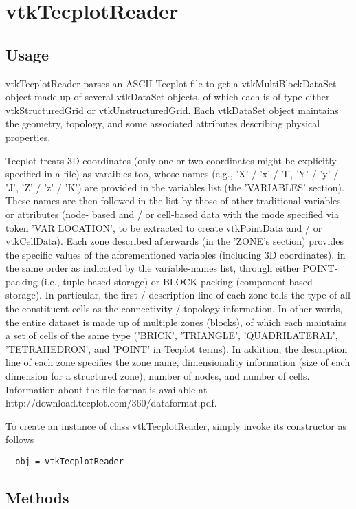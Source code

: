 \section{vtkTecplotReader}

\subsection{Usage}

  vtkTecplotReader parses an ASCII Tecplot file to get a vtkMultiBlockDataSet
  object made up of several vtkDataSet objects, of which each is of type
  either vtkStructuredGrid or vtkUnstructuredGrid. Each vtkDataSet object 
  maintains the geometry, topology, and some associated attributes describing
  physical properties.

  Tecplot treats 3D coordinates (only one or two coordinates might be
  explicitly specified in a file) as varaibles too, whose names (e.g.,
  'X' / 'x' / 'I', 'Y' / 'y' / 'J', 'Z' / 'z' / 'K') are provided in the
  variables list (the 'VARIABLES' section). These names are then followed
  in the list by those of other traditional variables or attributes (node-
  based and / or cell-based data with the mode specified via token 'VAR
  LOCATION', to be extracted to create vtkPointData and / or vtkCellData). 
  Each zone described afterwards (in the 'ZONE's section) provides the 
  specific values of the aforementioned variables (including 3D coordinates), 
  in the same order as indicated by the variable-names list, through either
  POINT-packing (i.e., tuple-based storage) or BLOCK-packing (component-based
  storage). In particular, the first / description line of  each zone tells 
  the type of all the  constituent cells as the connectivity / topology 
  information. In other words, the entire dataset is made up of multiple zones
  (blocks), of which each maintains a set of cells of the same type ('BRICK', 
  'TRIANGLE', 'QUADRILATERAL', 'TETRAHEDRON', and 'POINT' in Tecplot terms). 
  In addition, the description line of each zone specifies the zone name, 
  dimensionality information (size of each dimension for a structured zone), 
  number of nodes, and number of cells. Information about the file format is 
  available at http://download.tecplot.com/360/dataformat.pdf.
  

To create an instance of class vtkTecplotReader, simply
invoke its constructor as follows
\begin{verbatim}
  obj = vtkTecplotReader
\end{verbatim}
\subsection{Methods}

